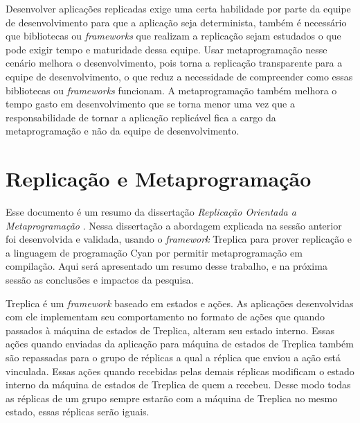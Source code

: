 \documentclass[12pt]{article}
\begin{document}
\begin{center}
\end{center}

Desenvolver aplicações replicadas exige uma certa habilidade por parte da equipe de 
desenvolvimento para que a aplicação seja determinista, também é necessário que 
bibliotecas ou \textit{frameworks} que realizam a replicação sejam estudados o que 
pode exigir tempo e maturidade dessa equipe.
Usar metaprogramação nesse cenário melhora o desenvolvimento, pois torna a replicação
transparente para a equipe de desenvolvimento, o que reduz a necessidade de compreender 
como essas bibliotecas ou \textit{frameworks} funcionam. A metaprogramação também 
melhora o tempo gasto em desenvolvimento que se torna menor uma vez que a 
responsabilidade de tornar a aplicação replicável fica a cargo da metaprogramação e 
não da equipe de desenvolvimento.

\section{Replicação e Metaprogramação}

Esse documento é um resumo da dissertação \textit{Replicação Orientada a Metaprogramação}
\cite{fellipe:2018}. Nessa dissertação a abordagem explicada 
na sessão anterior foi desenvolvida e validada, usando o \textit{framework} Treplica
\cite{vieira:2008} para prover replicação e a linguagem de programação Cyan
\cite{cyan:2018} por permitir metaprogramação em compilação. Aqui será apresentado 
um resumo desse trabalho, e na próxima sessão as conclusões e impactos da pesquisa.

Treplica é um \textit{framework} baseado em estados e ações. As aplicações 
desenvolvidas com ele implementam seu comportamento no formato de ações que 
quando passados à máquina de estados de Treplica,  
alteram seu estado interno. Essas ações quando enviadas da aplicação para máquina 
de estados de Treplica também são repassadas para o grupo de réplicas 
a qual a réplica que enviou a ação está vinculada. Essas ações quando recebidas 
pelas demais réplicas modificam o estado interno da máquina de estados de Treplica
de quem a recebeu. Desse modo todas as réplicas de um grupo sempre estarão com a
máquina de Treplica no mesmo estado, essas réplicas serão iguais.
\end{document}
